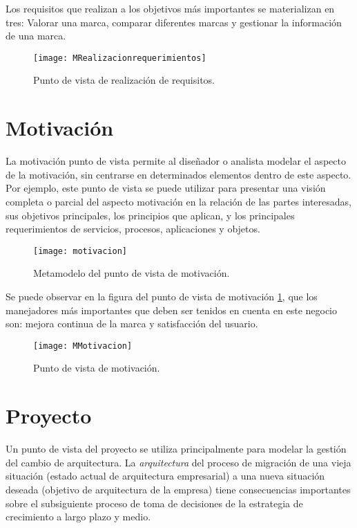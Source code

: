 Los requisitos que realizan a los objetivos más importantes se materializan en tres: Valorar una marca, comparar diferentes marcas y gestionar la información de una marca.

\begin{figure}[h]
\centering
\texttt{[image: MRealizacionrequerimientos]}
\caption{Punto de vista de realización de requisitos.}
\end{figure}


\section{Motivación}
La motivación punto de vista permite al diseñador o analista modelar el aspecto de la motivación, sin centrarse en determinados elementos dentro de este aspecto. Por ejemplo, este punto de vista se puede utilizar para presentar una visión completa o parcial del aspecto motivación en la relación de las partes interesadas, sus objetivos principales, los principios que aplican, y los principales requerimientos de servicios, procesos, aplicaciones y objetos.

\begin{figure}[H]
\centering
\texttt{[image: motivacion]}
\caption{Metamodelo del punto de vista de motivación.}
\end{figure}

Se puede observar en la figura del punto de vista de motivación \ref{mmotivacion}, que los manejadores más importantes que deben ser tenidos en cuenta en este negocio son: mejora continua de la marca y satisfacción del usuario. 

\begin{figure}[H]
\centering
\texttt{[image: MMotivacion]}
\caption{Punto de vista de motivación.}
\label{mmotivacion}
\end{figure}


\section{Proyecto}
Un punto de vista del proyecto se utiliza principalmente para modelar la gestión del cambio de arquitectura. La \textit{arquitectura} del proceso de migración de una vieja situación (estado actual de arquitectura empresarial) a una nueva situación deseada (objetivo de arquitectura de la empresa) tiene consecuencias importantes sobre el subsiguiente proceso de toma de decisiones de la estrategia de crecimiento a largo plazo y medio. 

